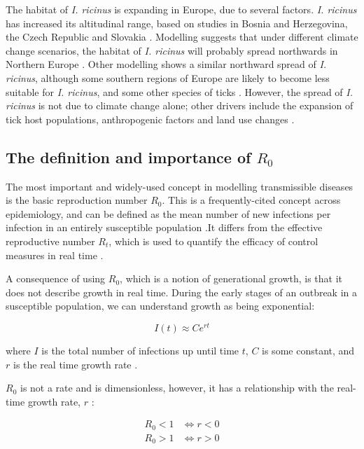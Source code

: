 \documentclass{article}
\begin{document}
The habitat of \textit{I. ricinus} is expanding in Europe, due to several factors. \textit{I. ricinus} has increased its altitudinal range, based on studies in Bosnia and Herzegovina, the Czech Republic and Slovakia \cite{Medlock2013}. Modelling suggests that under different climate change scenarios, the habitat of \textit{I. ricinus} will probably spread northwards in Northern Europe \cite{Alkishe_2017}. Other modelling shows a similar northward spread of \textit{I. ricinus}, although some southern regions of Europe are likely to become less suitable for \textit{I. ricinus}, and some other species of ticks \cite{Cunze_2022}. However, the spread of \textit{I. ricinus} is not due to climate change alone; other drivers include the expansion of tick host populations, anthropogenic factors and land use changes \cite{Medlock2013}.

\subsection{The definition and importance of \texorpdfstring{$ R_0 $}{R0}}

The most important and widely-used concept in modelling transmissible diseases is the basic reproduction number $ R_0 $. This is a frequently-cited concept across epidemiology, and can be defined as the mean number of new infections per infection in an entirely susceptible population \cite{Diekman2000}.It differs from the effective reproductive number $ R_t $, which is used to quantify the efficacy of control measures in real time \cite{Lim2020}.

A consequence of using $ R_0 $, which is a notion of generational growth, is that it does not describe growth in real time. During the early stages of an outbreak in a susceptible population, we can understand growth as being exponential:

\begin{equation}
	I(t) \approx Ce^{rt} \nonumber
\end{equation}

where $ I $ is the total number of infections up until time $ t $, $ C $ is some constant, and $ r $ is the real time growth rate \cite{Diekman2000}.

$ R_0 $ is not a rate and is dimensionless, however, it has a relationship with the real-time growth rate, $ r $ \cite{Diekman2000}:

\begin{align}\label{R0}
  R_0 < 1 &\iff r < 0 \nonumber \\
  R_0 > 1 &\iff r > 0
\end{align}
\end{document}
